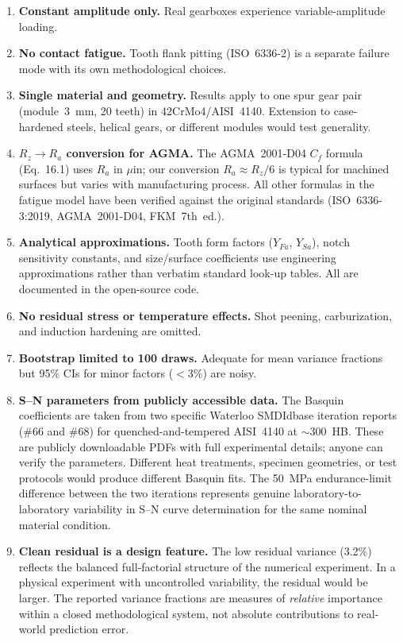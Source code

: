 \documentclass[12pt,a4paper]{article}
\begin{document}
\begin{enumerate}
  \item \textbf{Constant amplitude only.} Real gearboxes experience
        variable-amplitude loading.
  \item \textbf{No contact fatigue.} Tooth flank pitting (ISO~6336-2)
        is a separate failure mode with its own methodological choices.
  \item \textbf{Single material and geometry.} Results apply to one
        spur gear pair (module~3~mm, 20 teeth) in 42CrMo4/AISI~4140.
        Extension to case-hardened steels, helical gears, or different
        modules would test generality.
  \item \textbf{$R_z \rightarrow R_a$ conversion for AGMA.} The
        AGMA~2001-D04 $C_f$ formula (Eq.~16.1) uses $R_a$ in $\mu$in;
        our conversion $R_a \approx R_z/6$ is typical for machined
        surfaces but varies with manufacturing process. All other formulas
        in the fatigue model have been verified against the original
        standards (ISO~6336-3:2019, AGMA~2001-D04, FKM~7th~ed.).
  \item \textbf{Analytical approximations.} Tooth form factors
        ($Y_{Fa}$, $Y_{Sa}$), notch sensitivity constants, and
        size/surface coefficients use engineering approximations rather
        than verbatim standard look-up tables. All are documented in the
        open-source code.
  \item \textbf{No residual stress or temperature effects.} Shot peening,
        carburization, and induction hardening are omitted.
  \item \textbf{Bootstrap limited to 100 draws.} Adequate for mean
        variance fractions but 95\% CIs for minor factors ($<3\%$) are
        noisy.
  \item \textbf{S--N parameters from publicly accessible data.} The
        Basquin coefficients are taken from two specific Waterloo
        SMDIdbase iteration reports (\#66 and \#68) for quenched-and-tempered
        AISI~4140 at $\sim$300~HB. These are publicly downloadable PDFs
        with full experimental details; anyone can verify the parameters.
        Different heat treatments, specimen geometries, or test protocols
        would produce different Basquin fits. The 50~MPa endurance-limit
        difference between the two iterations represents genuine
        laboratory-to-laboratory variability in S--N curve determination
        for the same nominal material condition.
  \item \textbf{Clean residual is a design feature.} The low residual
        variance (3.2\%) reflects the balanced full-factorial structure of
        the numerical experiment. In a physical experiment with
        uncontrolled variability, the residual would be larger. The
        reported variance fractions are measures of \emph{relative}
        importance within a closed methodological system, not absolute
        contributions to real-world prediction error.
\end{enumerate}
\end{document}
